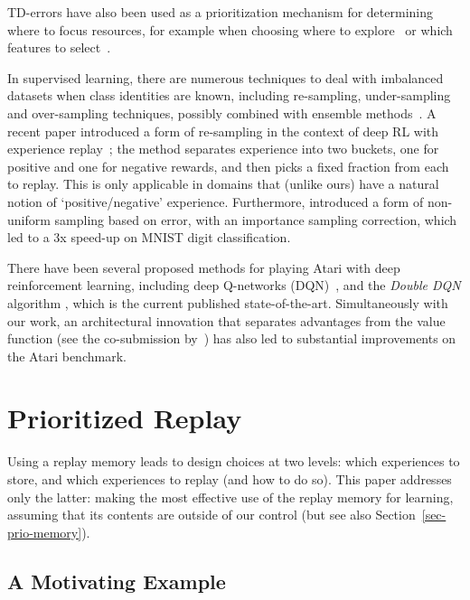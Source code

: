 \documentclass[a4paper]{article}
\begin{document}
TD-errors have also been used as a prioritization mechanism for determining where to focus resources, for example when choosing where to explore~\citep{white2014surprise} or which features to select~\citep{geramifard2011online,sun2011incremental}.

In supervised learning, there are numerous techniques to deal with imbalanced datasets
when class identities are known, including re-sampling, under-sampling and over-sampling techniques,
possibly combined with ensemble methods~\citep[for a review, see][]{imbalance-ensemble}.
A recent paper introduced a form of re-sampling in the context of deep RL with experience replay~\citep{narasimhan2015language}; the method separates experience into two buckets, one for positive and one for negative rewards, and then picks a fixed fraction from each to replay. This is only applicable in domains that (unlike ours) have a natural notion of `positive/negative' experience.
Furthermore, \citet{hinton2007} introduced a form of non-uniform sampling based on error, with an importance sampling correction,
which led to a 3x speed-up on MNIST digit classification.

There have been several proposed methods for playing Atari with deep reinforcement learning, including deep Q-networks (DQN)~\citep{dqn-workshop,dqn-nature,dagger,Stadie:2015,gorila,increasing_action_gap}, and the \emph{Double DQN} algorithm \citep{double-dqn}, which is the current published state-of-the-art.
Simultaneously with our work, an architectural innovation that separates advantages from the value function (see the co-submission by~\citealp{dueling}) 
has also led to substantial improvements on the Atari benchmark. 




\section{Prioritized Replay}
\label{sec-preplay}

Using a replay memory leads to design choices at two levels: which experiences to store,
and which experiences to replay (and how to do so). This paper addresses only the latter: making the
most effective use of the replay memory for learning, assuming that its contents are outside of our control 
(but see also Section~\ref{sec-prio-memory}).

\subsection{A Motivating Example}
\label{sec:example}
\end{document}
